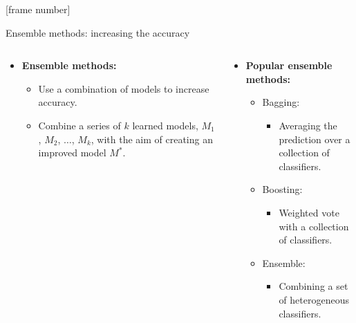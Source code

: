 \documentclass[aspectratio=169,t,table]{beamer}
\begin{document}
  {
    [frame number]
    \begin{frame}{Ensemble methods: increasing the accuracy}
      \begin{columns}
        \begin{column}{0.4\textwidth}
          \centering
          \begin{itemize}
            \item \textbf{{\color{airforceblue}Ensemble} methods:}
            \begin{itemize}
              \item Use a combination of models to increase accuracy.
              \item Combine a series of $k$ learned models, $M_1$, $M_2$, $\ldots$, $M_k$, with the aim of creating an improved model $M^*$.
            \end{itemize}
          \end{itemize}
        \end{column}
        \begin{column}{0.5\textwidth}
          \centering
          \begin{itemize}
            \item \textbf{Popular ensemble methods:}
            \begin{itemize}
              \item Bagging:
              \begin{itemize}
                \item Averaging the prediction over a collection of classifiers.
              \end{itemize}
              \item Boosting:
              \begin{itemize}
                \item Weighted vote with a collection of classifiers.
              \end{itemize}
              \item Ensemble:
              \begin{itemize}
                \item Combining a set of heterogeneous classifiers.
              \end{itemize}
            \end{itemize}
          \end{itemize}
        \end{column}
      \end{columns}
    \end{frame}
  }
\end{document}
